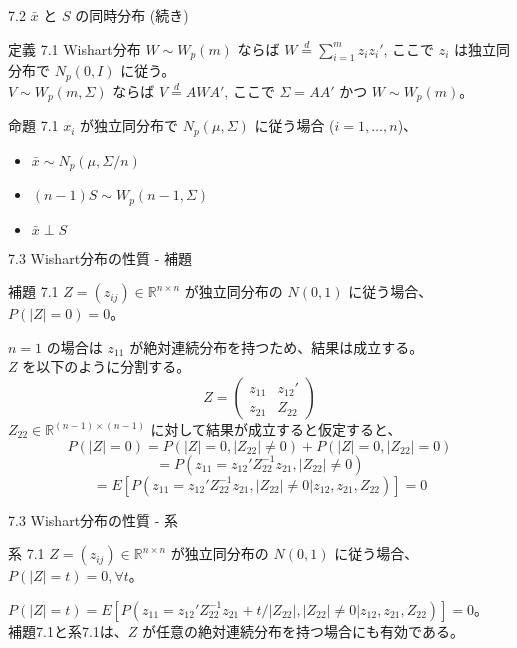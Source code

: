 \documentclass[aspectratio=169]{beamer}
\begin{document}
\begin{frame}{7.2 $\bar{x}$ と $S$ の同時分布 (続き)}
\begin{block}{定義 7.1 Wishart分布}
$W \sim W_p(m)$ ならば $W \overset{d}{=} \sum_{i=1}^{m} z_i z_i'$, ここで $z_i$ は独立同分布で $N_p(0, I)$ に従う。\\
$V \sim W_p(m, \Sigma)$ ならば $V \overset{d}{=} AWA'$, ここで $\Sigma=AA'$ かつ $W \sim W_p(m)$。
\end{block}

\begin{block}{命題 7.1}
$x_i$ が独立同分布で $N_p(\mu, \Sigma)$ に従う場合 ($i=1, \dots, n$)、
\begin{itemize}
    \item $\bar{x} \sim N_p(\mu, \Sigma/n)$ 
    \item $(n-1)S \sim W_p(n-1, \Sigma)$ 
    \item $\bar{x} \perp S$ 
\end{itemize}
\end{block}
\end{frame}

\begin{frame}{7.3 Wishart分布の性質 - 補題}
\begin{block}{補題 7.1}
$Z = (z_{ij}) \in \mathbb{R}^{n \times n}$ が独立同分布の $N(0, 1)$ に従う場合、$P(|Z| = 0) = 0$。
\end{block}

$n=1$ の場合は $z_{11}$ が絶対連続分布を持つため、結果は成立する。\\
$Z$ を以下のように分割する。
\[
Z = \begin{pmatrix} z_{11} & z_{12}' \\ z_{21} & Z_{22} \end{pmatrix}
\]
$Z_{22} \in \mathbb{R}^{(n-1) \times (n-1)}$ に対して結果が成立すると仮定すると、
\[
P(|Z|=0) = P(|Z|=0, |Z_{22}| \ne 0) + P(|Z|=0, |Z_{22}|=0)
\]
\[
= P(z_{11} = z_{12}'Z_{22}^{-1}z_{21}, |Z_{22}| \ne 0)
\]
\[
= E[P(z_{11} = z_{12}'Z_{22}^{-1}z_{21}, |Z_{22}| \ne 0 | z_{12}, z_{21}, Z_{22})] = 0
\]
\end{frame}

\begin{frame}{7.3 Wishart分布の性質 - 系}
\begin{block}{系 7.1}
$Z = (z_{ij}) \in \mathbb{R}^{n \times n}$ が独立同分布の $N(0, 1)$ に従う場合、$P(|Z| = t) = 0, \forall t$。
\end{block}

$P(|Z| = t) = E[P(z_{11} = z_{12}'Z_{22}^{-1}z_{21} + t/|Z_{22}|, |Z_{22}| \ne 0 | z_{12}, z_{21}, Z_{22})] = 0$。\\
補題7.1と系7.1は、$Z$ が任意の絶対連続分布を持つ場合にも有効である。
\end{frame}
\end{document}
